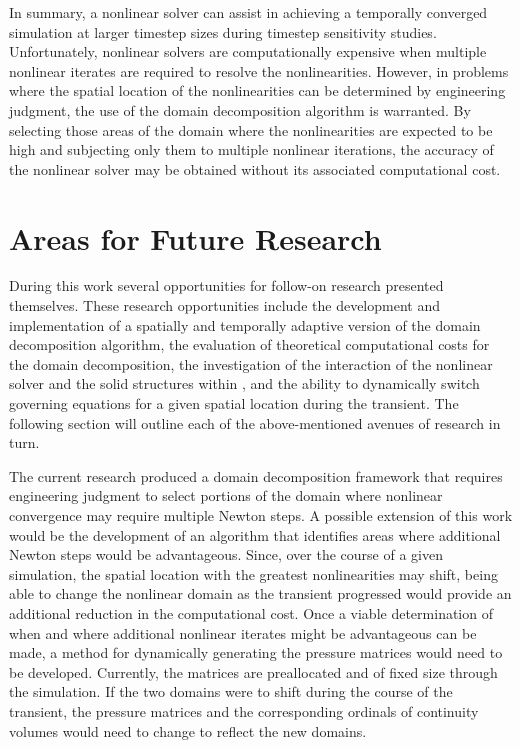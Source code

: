 In summary, a nonlinear solver can assist in achieving a temporally converged simulation at larger timestep sizes during timestep sensitivity studies.
Unfortunately, nonlinear solvers are computationally expensive when multiple nonlinear iterates are required to resolve the nonlinearities.
However, in problems where the spatial location of the nonlinearities can be determined by engineering judgment, the use of the domain decomposition algorithm is warranted.
By selecting those areas of the domain where the nonlinearities are expected to be high and subjecting only them to multiple nonlinear iterations, the accuracy of the nonlinear solver may be obtained without its associated computational cost.

\section{Areas for Future Research}
\label{sect:futureWork}
During this work several opportunities for follow-on research presented themselves.
These research opportunities include the development and implementation of a spatially and temporally adaptive version of the domain decomposition algorithm, the evaluation of theoretical computational costs for the domain decomposition, the investigation of the interaction of the nonlinear solver and the solid structures within \cobra{}, and the ability to dynamically switch governing equations for a given spatial location during the transient.
The following section will outline each of the above-mentioned avenues of research in turn.

The current research produced a domain decomposition framework that requires engineering judgment to select portions of the domain where nonlinear convergence may require multiple Newton steps.
A possible extension of this work would be the development of an algorithm that identifies areas where additional Newton steps would be advantageous.
Since, over the course of a given simulation, the spatial location with the greatest nonlinearities may shift, being able to change the nonlinear domain as the transient progressed would provide an additional reduction in the computational cost.
Once a viable determination of when and where additional nonlinear iterates might be advantageous can be made, a method for dynamically generating the pressure matrices would need to be developed.
Currently, the matrices are preallocated and of fixed size through the simulation.
If the two domains were to shift during the course of the transient, the pressure matrices and the corresponding ordinals of continuity volumes would need to change to reflect the new domains.


